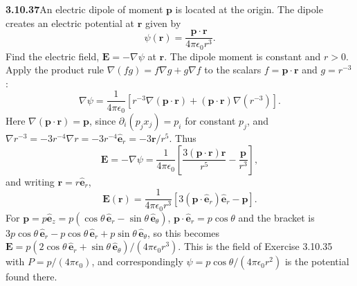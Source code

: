 \par\bigskip
\noindent\textbf{3.10.37}\quad An electric dipole of moment $\mathbf{p}$ is
located at the origin. The dipole creates an electric potential at
$\mathbf{r}$ given by
\[
\psi(\mathbf{r})=\frac{\mathbf{p}\cdot\mathbf{r}}{4\pi\epsilon_{0}r^{3}}.
\]
Find the electric field, $\mathbf{E}=-\nabla\psi$ at $\mathbf{r}$.
\solution
The dipole moment is constant and $r>0$. Apply the product rule
$\nabla(fg)=f\nabla g+g\nabla f$ to the scalars $f=\mathbf p\cdot\mathbf r$
and $g=r^{-3}$:
\[
\nabla\psi=\frac1{4\pi\epsilon_0}
\left[r^{-3}\nabla(\mathbf p\cdot\mathbf r)
+(\mathbf p\cdot\mathbf r)\nabla(r^{-3})\right].
\]
Here $\nabla(\mathbf p\cdot\mathbf r)=\mathbf p$, since
$\partial_i(p_jx_j)=p_i$ for constant $p_j$, and
$\nabla r^{-3}=-3r^{-4}\nabla r=-3r^{-4}\hat{\mathbf e}_r=-3\mathbf r/r^5$.
Thus
\[
\mathbf E=-\nabla\psi=\frac1{4\pi\epsilon_0}
\left[\frac{3(\mathbf p\cdot\mathbf r)\mathbf r}{r^5}-\frac{\mathbf p}{r^3}\right],
\]
and writing $\mathbf r=r\hat{\mathbf e}_r$,
\[
\boxed{\mathbf E(\mathbf r)=\frac1{4\pi\epsilon_0r^3}
\left[3(\mathbf p\cdot\hat{\mathbf e}_r)\hat{\mathbf e}_r-\mathbf p\right]}.
\]
For $\mathbf p=p\hat{\mathbf e}_z
=p(\cos\theta\,\hat{\mathbf e}_r-\sin\theta\,\hat{\mathbf e}_\theta)$,
$\mathbf p\cdot\hat{\mathbf e}_r=p\cos\theta$ and the bracket is
$3p\cos\theta\,\hat{\mathbf e}_r-p\cos\theta\,\hat{\mathbf e}_r
+p\sin\theta\,\hat{\mathbf e}_\theta$, so
this becomes
$\mathbf E=p(2\cos\theta\,\hat{\mathbf e}_r+\sin\theta\,\hat{\mathbf e}_\theta)/
(4\pi\epsilon_0r^3)$. This is the field of Exercise 3.10.35 with
$P=p/(4\pi\epsilon_0)$, and correspondingly
$\psi=p\cos\theta/(4\pi\epsilon_0r^2)$ is the potential found there.
